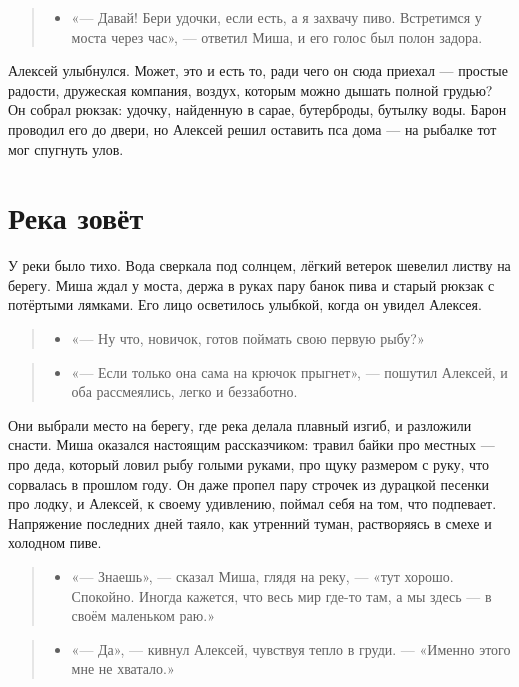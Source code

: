 \documentclass[12pt,a4paper]{book}
\newenvironment{dialogue}{\begin{quote}\itshape\begin{itemize}\item[]}{\end{itemize}\end{quote}}
\begin{document}
\begin{dialogue}
«— Давай! Бери удочки, если есть, а я захвачу пиво. Встретимся у моста через час», — ответил Миша, и его голос был полон задора.
\end{dialogue}

Алексей улыбнулся. Может, это и есть то, ради чего он сюда приехал — простые радости, дружеская компания, воздух, которым можно дышать полной грудью? Он собрал рюкзак: удочку, найденную в сарае, бутерброды, бутылку воды. Барон проводил его до двери, но Алексей решил оставить пса дома — на рыбалке тот мог спугнуть улов.

\section{Река зовёт}

У реки было тихо. Вода сверкала под солнцем, лёгкий ветерок шевелил листву на берегу. Миша ждал у моста, держа в руках пару банок пива и старый рюкзак с потёртыми лямками. Его лицо осветилось улыбкой, когда он увидел Алексея.

\begin{dialogue}
«— Ну что, новичок, готов поймать свою первую рыбу?»
\end{dialogue}

\begin{dialogue}
«— Если только она сама на крючок прыгнет», — пошутил Алексей, и оба рассмеялись, легко и беззаботно.
\end{dialogue}

Они выбрали место на берегу, где река делала плавный изгиб, и разложили снасти. Миша оказался настоящим рассказчиком: травил байки про местных — про деда, который ловил рыбу голыми руками, про щуку размером с руку, что сорвалась в прошлом году. Он даже пропел пару строчек из дурацкой песенки про лодку, и Алексей, к своему удивлению, поймал себя на том, что подпевает. Напряжение последних дней таяло, как утренний туман, растворяясь в смехе и холодном пиве.

\begin{dialogue}
«— Знаешь», — сказал Миша, глядя на реку, — «тут хорошо. Спокойно. Иногда кажется, что весь мир где-то там, а мы здесь — в своём маленьком раю.»
\end{dialogue}

\begin{dialogue}
«— Да», — кивнул Алексей, чувствуя тепло в груди. — «Именно этого мне не хватало.»
\end{dialogue}
\end{document}
